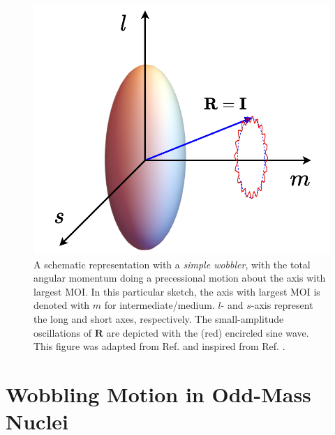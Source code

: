\begin{figure}
    \centering
    \includegraphics[scale=0.65]{Chapters/Figures/simple-wobbler.pdf}
    \caption{A schematic representation with a \emph{simple wobbler}, with the total angular momentum doing a precessional motion about the axis with largest MOI. In this particular sketch, the axis with largest MOI is denoted with $m$ for intermediate/medium. $l$- and $s$-axis represent the long and short axes, respectively. The small-amplitude oscillations of $\mathbf{R}$ are depicted with the (red) encircled sine wave. This figure was adapted from Ref. \cite{poenaru2021extensive} and inspired from Ref. \cite{sensharma2020longitudinal}.}
    \label{simple-wobbler-geometrical-schematic}
\end{figure}

\section{Wobbling Motion in Odd-Mass Nuclei}
